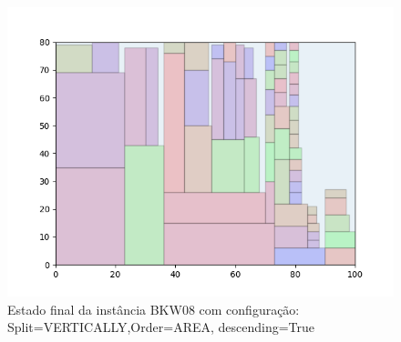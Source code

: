\begin{figure}[H]
    \centering
    \caption[]{Estado final da instância BKW08 com configuração: Split=VERTICALLY,Order=AREA, descending=True}
    \label{fig:bkw08-vertically-area-true}
    \includegraphics[scale=0.5]{output/figures/bkw/bkw08/vertically/area/true/00}
\end{figure}